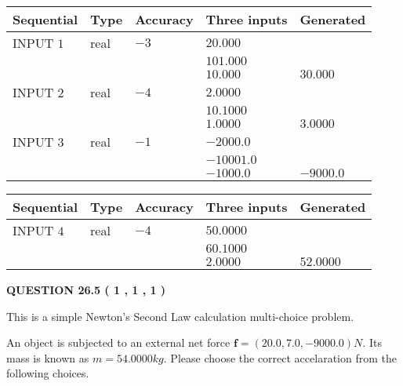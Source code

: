 \documentclass[12pt]{article}
\begin{document}
  
\noindent\begin{tabular}{|l|l|l|l|l|}
\hline
 Sequential & Type & Accuracy & Three inputs & Generated \\ 
\hline
 
 
  INPUT $            1 $ & real & $           -3  $ & $
 20.000
  $ & \\
  & & &  $
 101.000
  $ & \\
  & & &  $
 10.000
 $ & $ 30.000 $ 
 \\  \hline  
 
 
  INPUT $            2 $ & real & $           -4  $ & $
 2.0000
  $ & \\
  & & &  $
 10.1000
  $ & \\
  & & &  $
 1.0000
 $ & $ 3.0000 $ 
 \\  \hline  
 
 
  INPUT $            3 $ & real & $           -1  $ & $
 -2000.0
  $ & \\
  & & &  $
 -10001.0
  $ & \\
  & & &  $
 -1000.0
 $ & $ -9000.0 $ 
 \\  \hline  
 \end{tabular}
   
   
  
  
\noindent\begin{tabular}{|l|l|l|l|l|}
\hline
 Sequential & Type & Accuracy & Three inputs & Generated \\ 
\hline
 
 
  INPUT $            4 $ & real & $           -4  $ & $
 50.0000
  $ & \\
  & & &  $
 60.1000
  $ & \\
  & & &  $
 2.0000
 $ & $ 52.0000 $ 
 \\  \hline  
 \end{tabular}
   
   
  
\vspace{0.2in}
  
{\textbf{\Large{QUESTION
26.5 
 (           1 ,           1 ,           1 )
}}}
  
  


\noindent{}
This is a simple Newton's Second Law calculation multi-choice problem.  
\noindent{}


 
 
An object is subjected to an external net force $\mathbf{f}=
(20.0 , 7.0 , -9000.0) N$.
Its mass is known as $m= %
54.0000 kg$. Please choose the
correct accelaration from the following choices.
 
\end{document}
